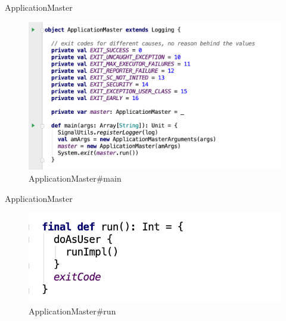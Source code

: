 \begin{frame}[plain,t]{ApplicationMaster} %
	 \\  \vspace{2ex}
	\begin{figure}
		\centering
		\includegraphics[width=0.9\linewidth]{images/app001}
		\caption{ApplicationMaster\#main}
		\label{fig:app001}
	\end{figure}
	

\end{frame}
\begin{frame}[plain,t]{ApplicationMaster} %
	 \\  \vspace{2ex}
	\begin{figure}
		\centering
		\includegraphics[width=0.9\linewidth]{images/app002}
		\caption{ApplicationMaster\#run}
		\label{fig:app002}
	\end{figure}
\end{frame}
